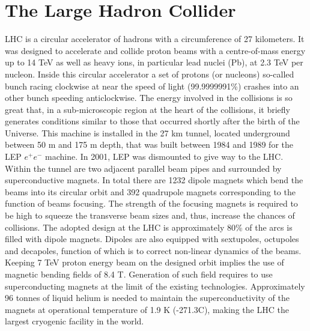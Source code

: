 \section{The Large Hadron Collider}
\label{chap2:LHC}
LHC is a circular accelerator of hadrons with a circumference of 27 kilometers. It was designed to accelerate and collide proton beams with a centre-of-mass energy up to 14 TeV as well as heavy ions, in particular lead nuclei (Pb), at 2.3 TeV per nucleon. Inside this circular accelerator a set of protons (or nucleons) so-called bunch racing clockwise at near the speed of light (99.9999991\%) crashes into an other bunch speeding anticlockwise. The energy involved in the collisions is so great that, in a sub-microscopic region at the heart of the collisions, it briefly generates conditions similar to those that occurred shortly after the birth of the Universe. This machine is installed in the 27 km tunnel, located underground between 50 m and 175 m depth, that was built between 1984 and 1989 for the LEP $e^+e^-$ machine. In 2001, LEP was dismounted to give way to the LHC. \\ 
Within the tunnel are two adjacent parallel beam pipes and surrounded by superconductive magnets. In total there are 1232 dipole magnets which bend the beams into its circular orbit and 392 quadrupole magnets corresponding to the function of beams focusing. The strength of the focusing magnets is required to be high to squeeze the transverse beam sizes and, thus, increase the chances of collisions. The adopted design at the LHC is approximately 80\% of the arcs is filled with dipole magnets. Dipoles are also equipped with sextupoles, octupoles and decapoles, function of which is to correct non-linear dynamics of the beams.  Keeping 7 TeV proton energy beam on the designed orbit implies the use of magnetic bending fields of 8.4 T. Generation of such field requires to use superconducting magnets at the limit of the existing technologies. Approximately 96 tonnes of liquid helium is needed to maintain the superconductivity of the magnets at  operational temperature of 1.9 K (-271.3C), making the LHC the largest cryogenic facility in the world.

